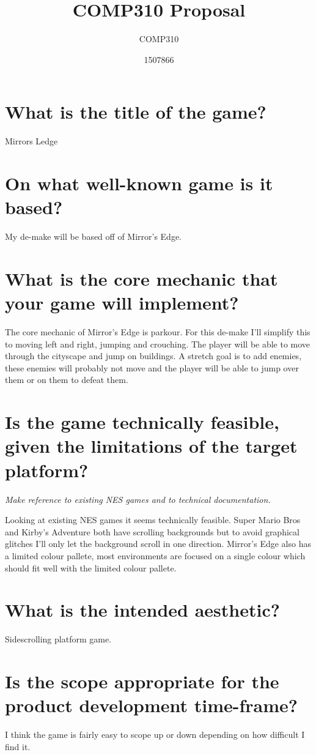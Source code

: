 \documentclass{scrartcl}
\title{COMP310 Proposal}
\subtitle{COMP310}
\author{1507866}
\begin{document}
	
\maketitle
\section{What is the title of the game?}
Mirrors Ledge
\section{On what well-known game is it based?}
My de-make will be based off of Mirror's Edge. 

\section{What is the core mechanic that your game will implement?}
The core mechanic of Mirror's Edge is parkour. For this de-make I'll simplify this to moving left and right, jumping and crouching. The player will be able to move through the cityscape and jump on buildings. 
A stretch goal is to add enemies, these enemies will probably not move and the player will be able to jump over them or on them to defeat them. 

\section{Is the game technically feasible, given the limitations of the target platform?} \textit{Make reference to existing NES games and to technical documentation.}

Looking at existing NES games it seems technically feasible. Super Mario Bros and Kirby's Adventure both have scrolling backgrounds but to avoid graphical glitches I'll only let the background scroll in one direction.
Mirror's Edge also has a limited colour pallete, most environments are focused on a single colour which should fit well with the limited colour pallete.



\section{What is the intended aesthetic?}
Sidescrolling platform game.


\section{Is the scope appropriate for the product development time-frame?}
I think the game is fairly easy to scope up or down depending on how difficult I find it. 
	
\end{document}

